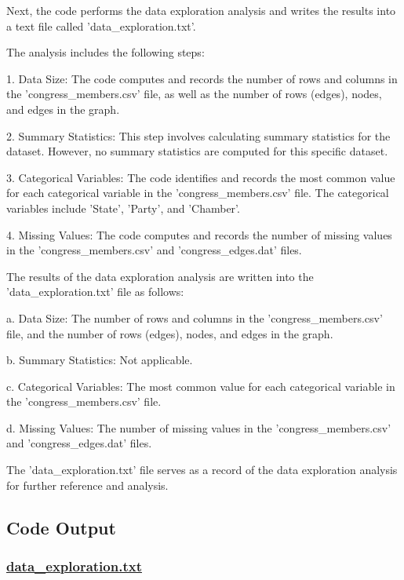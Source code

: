 \documentclass[11pt]{article}
\begin{document}
Next, the code performs the data exploration analysis and writes the results into a text file called 'data\_exploration.txt'.

The analysis includes the following steps:

1. Data Size: The code computes and records the number of rows and columns in the 'congress\_members.csv' file, as well as the number of rows (edges), nodes, and edges in the graph.

2. Summary Statistics: This step involves calculating summary statistics for the dataset. However, no summary statistics are computed for this specific dataset.

3. Categorical Variables: The code identifies and records the most common value for each categorical variable in the 'congress\_members.csv' file. The categorical variables include 'State', 'Party', and 'Chamber'.

4. Missing Values: The code computes and records the number of missing values in the 'congress\_members.csv' and 'congress\_edges.dat' files.

The results of the data exploration analysis are written into the 'data\_exploration.txt' file as follows:

a. Data Size: The number of rows and columns in the 'congress\_members.csv' file, and the number of rows (edges), nodes, and edges in the graph.

b. Summary Statistics: Not applicable.

c. Categorical Variables: The most common value for each categorical variable in the 'congress\_members.csv' file.

d. Missing Values: The number of missing values in the 'congress\_members.csv' and 'congress\_edges.dat' files.

The 'data\_exploration.txt' file serves as a record of the data exploration analysis for further reference and analysis.

\subsection{Code Output}\hypertarget{file-data-exploration-txt}{}

\subsubsection*{\hyperlink{code-Data Exploration-data-exploration-txt}{data\_exploration.txt}}
\end{document}
